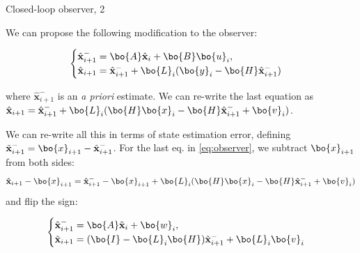 \documentclass{beamer}
\newcommand{\bhat}[1] {\hat{\mathbf{#1}}}
\newcommand{\btil}[1] {\Tilde{\mathbf{#1}}}
\begin{document}
\begin{frame}{Closed-loop observer, 2}
	\begin{flushleft}
		
		
		We can propose the following modification to the observer:
		
		\begin{equation}
			\label{eq:observer}
			\begin{cases}
				\bhat{x}_{i+1}^- = \bo{A} \bhat{x}_i + \bo{B} \bo{u}_i, \\
				\bhat{x}_{i+1} = \bhat{x}_{i+1}^- + \bo{L}_i (\bo{y}_i - \bo{H} \bhat{x}_{i+1}^-)
			\end{cases}
		\end{equation}
		
		where $\bhat{x}_{i+1}^-$ is an \emph{a priori} estimate. \textcolor{mylightgray}{We can re-write the last equation as 
			$\bhat{x}_{i+1} = \bhat{x}_{i+1}^- + \bo{L}_i (\bo{H} \bo{x}_i - \bo{H} \bhat{x}_{i+1}^- + \bo{v}_i) $.} 
		
		\bigskip
		
		We can re-write all this in terms of state estimation error, defining $\btil{x}_{i+1}^- = \bo{x}_{i+1} - \bhat{x}_{i+1}^-$. For the last eq. in \eqref{eq:observer}, we subtract $\bo{x}_{i+1}$ from both sides:
		\begin{equation}
		\bhat{x}_{i+1}-\bo{x}_{i+1} = \bhat{x}_{i+1}^- - \bo{x}_{i+1} + 
		\bo{L}_i (\bo{H} \bo{x}_i - \bo{H} \bhat{x}_{i+1}^- + \bo{v}_i) 
		\end{equation}				
		 and flip the sign:
		
		\begin{equation}
	\begin{cases}
		\btil{x}_{i+1}^- = \bo{A} \btil{x}_i + \bo{w}_i, \\
		\btil{x}_{i+1} = (\bo{I} - \bo{L}_i \bo{H}) \btil{x}_{i+1}^- + \bo{L}_i\bo{v}_i
	\end{cases}
		\end{equation}		
	
		
		
	\end{flushleft}
\end{frame}
\end{document}
